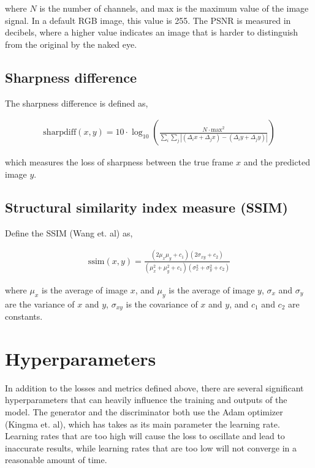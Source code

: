 \documentclass{article}
\begin{document}
where $N$ is the number of channels, and $\mathrm{max}$ is the maximum value of the image signal. In a default RGB image, this value is 255. The PSNR is measured in decibels, where a higher value indicates an image that is harder to distinguish from the original by the naked eye.

\subsection{Sharpness difference}

The sharpness difference is defined as,

\begin{align*}
    \mathrm{sharpdiff}(x, y) = 10 \cdot \log_{10}\left(\frac{N \cdot
    \mathrm{max}^2}{\sum_i \sum_j |(\Delta_i x + \Delta_j x) - (\Delta_i
    y + \Delta_j y)|}\right)
\end{align*}

which measures the loss of sharpness between the true frame $x$ and the predicted image $y$.

\subsection{Structural similarity index measure (SSIM)}

Define the SSIM (Wang et. al) as,

\begin{align*}
    \mathrm{ssim}(x, y) = \frac{(2\mu_x\mu_y + c_1)(2\sigma_{xy} + c_2)}
    {(\mu_x^2 + \mu_y^2 + c_1)(\sigma_x^2 + \sigma_y^2 + c_2)}
\end{align*}

where $\mu_x$ is the average of image $x$, and $\mu_y$ is the average of image $y$, $\sigma_x$ and $\sigma_y$ are the variance of $x$ and $y$, $\sigma_{xy}$ is the covariance of $x$ and $y$, and $c_1$ and $c_2$ are constants.

\section{Hyperparameters}

In addition to the losses and metrics defined above, there are several significant hyperparameters that can heavily influence the training and outputs of the model. The generator and the discriminator both use the Adam optimizer (Kingma et. al), which has takes as its main parameter the learning rate. Learning rates that are too high will cause the loss to oscillate and lead to inaccurate results, while learning rates that are too low will not converge in a reasonable amount of time.
\end{document}
